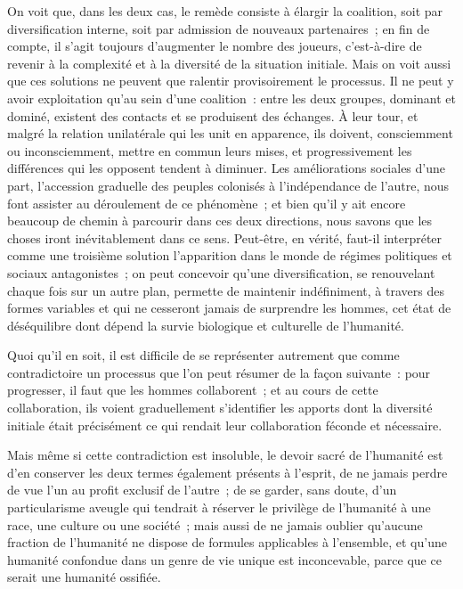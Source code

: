 \documentclass[french,twoside]{book} %
\begin{document}
On voit que, dans les deux cas, le remède consiste à élargir la coalition, soit par diversification interne, soit par admission de nouveaux partenaires ; en fin de compte, il s’agit toujours d’augmenter le nombre des joueurs, c’est-à-dire de revenir à la complexité et à la diversité de la situation initiale. Mais on voit aussi que ces solutions ne peuvent que ralentir provisoirement le processus. Il ne peut y avoir exploitation qu’au sein d’une coalition : entre les deux groupes, dominant et dominé, existent des contacts et se produisent des échanges. À leur tour, et malgré la relation unilatérale qui les unit en apparence, ils doivent, consciemment ou inconsciemment, mettre en commun leurs mises, et progressivement les différences qui les opposent tendent à diminuer. Les améliorations sociales d’une part, l’accession graduelle des peuples colonisés à l’indépendance de l’autre, nous font assister au déroulement de ce phénomène ; et bien qu’il y ait encore beaucoup de chemin à parcourir dans ces deux directions, nous savons que les choses iront inévitablement dans ce sens. Peut-être, en vérité, faut-il interpréter comme une troisième solution l’apparition dans le monde de régimes politiques et sociaux antagonistes ; on peut concevoir qu’une diversification, se renouvelant chaque fois sur un autre plan, permette de maintenir indéfiniment, à travers des formes variables et qui ne cesseront jamais de surprendre les hommes, cet état de déséquilibre dont dépend la survie biologique et culturelle de l’humanité.\par
Quoi qu’il en soit, il est difficile de se représenter autrement que comme contradictoire un processus que l’on peut résumer de la façon suivante : pour progresser, il faut que les hommes collaborent ; et au cours de cette collaboration, ils voient graduellement s’identifier les apports dont la diversité initiale était précisément ce qui rendait leur collaboration féconde et nécessaire.\par
Mais même si cette contradiction est insoluble, le devoir sacré de l’humanité est d’en conserver les deux termes également présents à l’esprit, de ne jamais perdre de vue l’un au profit exclusif de l’autre ; de se garder, sans doute, d’un particularisme aveugle qui tendrait à réserver le privilège de l’humanité à une race, une culture ou une société ; mais aussi de ne jamais oublier qu’aucune fraction de l’humanité ne dispose de formules applicables à l’ensemble, et qu’une humanité confondue dans un genre de vie unique est inconcevable, parce que ce serait une humanité ossifiée.\par
\end{document}
